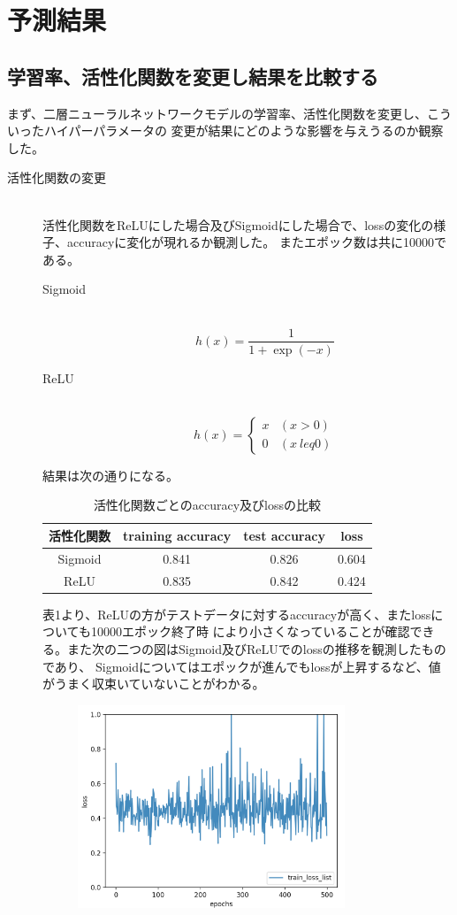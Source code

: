 \documentclass[uplatex]{jsarticle}
\begin{document}
\section{予測結果}
\subsection{学習率、活性化関数を変更し結果を比較する}
まず、二層ニューラルネットワークモデルの学習率、活性化関数を変更し、こういったハイパーパラメータの
変更が結果にどのような影響を与えうるのか観察した。
\begin{description}
  \item[活性化関数の変更]\mbox{}\\
  活性化関数をReLUにした場合及びSigmoidにした場合で、lossの変化の様子、accuracyに変化が現れるか観測した。
  またエポック数は共に10000である。
  \begin{description}
    \item[Sigmoid]\mbox{}\\
    $$h(x) = \frac{1}{1 + \exp{(-x)}}$$
    \item[ReLU]\mbox{}\\
    \[
    h(x) = \begin{cases}
      x & (x > 0) \\
      0 & (x \ leq 0)
    \end{cases}
  \]
  \end{description}
  結果は次の通りになる。
  \begin{table}[htb]
    \centering
    \caption{活性化関数ごとのaccuracy及びlossの比較}
    \begin{tabular}{|c||c|c|c|} \hline
      活性化関数 & training accuracy &  test accuracy & loss \\ \hline \hline
      Sigmoid & 0.841 & 0.826 & 0.604 \\ \hline
      ReLU & 0.835 & 0.842 & 0.424 \\ \hline
    \end{tabular}
  \end{table}
  表1より、ReLUの方がテストデータに対するaccuracyが高く、またlossについても10000エポック終了時
  により小さくなっていることが確認できる。また次の二つの図はSigmoid及びReLUでのlossの推移を観測したものであり、
  Sigmoidについてはエポックが進んでもlossが上昇するなど、値がうまく収束いていないことがわかる。
  \begin{figure}[htbp]
  \begin{minipage}{0.5\hsize}
   \begin{center}
    \includegraphics[width=80mm]{img/sigmoid.png}

\end{center}
\end{minipage}
\end{figure}
\end{description}
\end{document}
